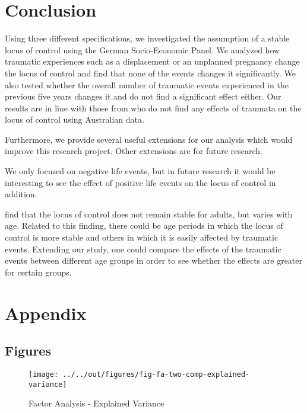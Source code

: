 \documentclass[12pt, a4paper, fleqn, parskip]{scrartcl}
\begin{document}


\section{Conclusion} %
\label{sec:conclusion}

Using three different specifications, we investigated the assumption of a
stable locus of control using the German Socio-Economic Panel. We analyzed how
traumatic experiences such as a displacement or an unplanned pregnancy change
the locus of control and find that none of the events changes it significantly.
We also tested whether the overall number of traumatic events experienced in
the previous five years changes it and do not find a significant effect either.
Our results are in line with those from \citet{cobb2013} who do not find any
effects of traumata on the locus of control using Australian data.

Furthermore, we provide several useful extensions for our analysis which would
improve this research project. Other extensions are for future research.

We only focused on negative life events, but in future research it would be
interesting to see the effect of positive life events on the locus of control
in addition.

\citet{specht2013} find that the locus of control does not remain stable for
adults, but varies with age. Related to this finding, there could be age
periods in which the locus of control is more stable and others in which it is
easily affected by traumatic events. Extending our study, one could compare the
effects of the traumatic events between different age groups in order to see
whether the effects are greater for certain groups.


\printbibliography

\appendix
\setcounter{secnumdepth}{0}
\section{Appendix}

\subsection{Figures} %
\label{sub:figures}

\begin{figure}[H]
    \centering
    \texttt{[image: ../../out/figures/fig-fa-two-comp-explained-variance]}
    \caption{Factor Analysis - Explained Variance}
    \label{fig:fa_ev}
\end{figure}
\end{document}

